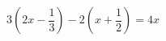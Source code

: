 \begin{ex}[type=equation]
	\begin{condition}
		$3\left(2x -\dfrac{1}{3}\right) - 2\left(x+\dfrac{1}{2}\right) = 4x$
	\end{condition}
\end{ex}